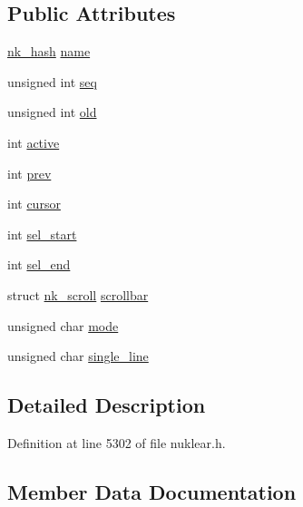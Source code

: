 \subsection*{Public Attributes}
\begin{DoxyCompactItemize}
\item 
\mbox{\hyperlink{nuklear_8h_a2123e2728db7d1f136b57d6528a0d757}{nk\+\_\+hash}} \mbox{\hyperlink{structnk__edit__state_a87920c698f22575eab9d07d5ebae318e}{name}}
\item 
unsigned int \mbox{\hyperlink{structnk__edit__state_a1c65e389e43214b89c65214a859e883f}{seq}}
\item 
unsigned int \mbox{\hyperlink{structnk__edit__state_ab71fb9bbac77248af5f1c3bd1471ddfc}{old}}
\item 
int \mbox{\hyperlink{structnk__edit__state_a29e96834b044eb48096b50ee584d3528}{active}}
\item 
int \mbox{\hyperlink{structnk__edit__state_aaacf3bdbd141697e4f5645f128bcf785}{prev}}
\item 
int \mbox{\hyperlink{structnk__edit__state_ab416471cb61eacf633a05ad54d8c6bc8}{cursor}}
\item 
int \mbox{\hyperlink{structnk__edit__state_aeecc32de6d1be464baa562d9bba3a351}{sel\+\_\+start}}
\item 
int \mbox{\hyperlink{structnk__edit__state_a529ee69a1bb79ac2d3377c2d052f5774}{sel\+\_\+end}}
\item 
struct \mbox{\hyperlink{structnk__scroll}{nk\+\_\+scroll}} \mbox{\hyperlink{structnk__edit__state_af66f1fff3c22f0149b513ec224360f74}{scrollbar}}
\item 
unsigned char \mbox{\hyperlink{structnk__edit__state_ae841853374d727742a6ac7d31e9346e6}{mode}}
\item 
unsigned char \mbox{\hyperlink{structnk__edit__state_ab124091270e7af08f6df9410a647ae1c}{single\+\_\+line}}
\end{DoxyCompactItemize}


\subsection{Detailed Description}


Definition at line 5302 of file nuklear.\+h.



\subsection{Member Data Documentation}
\mbox{\label{structnk__edit__state_a29e96834b044eb48096b50ee584d3528}} 
